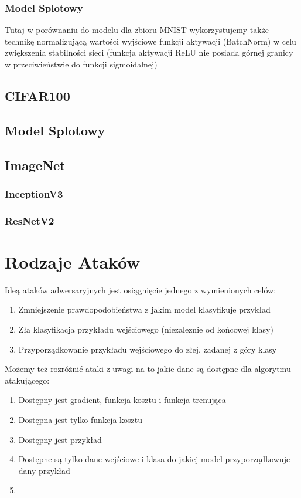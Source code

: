 \documentclass{article}
\begin{document}
        \subsubsection{Model Splotowy}
        Tutaj w porównaniu do modelu dla zbioru MNIST wykorzystujemy także technikę normalizującą wartości wyjściowe
        funkcji aktywacji (BatchNorm) w celu zwiększenia stabilności sieci (funkcja aktywacji ReLU nie posiada górnej granicy w
        przeciwieństwie do funkcji sigmoidalnej)

    \subsection{CIFAR100}
        \subsection{Model Splotowy}


    \subsection{ImageNet}
        \subsubsection{InceptionV3}
        \subsubsection{ResNetV2}




\section{Rodzaje Ataków}
Ideą ataków adwersaryjnych  jest osiągnięcie jednego z wymienionych celów:
\begin{enumerate}
    \item Zmniejszenie prawdopodobieństwa z jakim model klasyfikuje przykład
    \item Zła klasyfikacja przykładu wejściowego (niezaleznie od końcowej klasy)
    \item Przyporządkowanie przykładu wejściowego do złej, zadanej z góry klasy
\end{enumerate}

Możemy też rozróżnić ataki z uwagi na to jakie dane są dostępne dla algorytmu atakującego:
\begin{enumerate}
    \item Dostępny jest gradient, funkcja kosztu i funkcja trenująca
    \item Dostępna jest tylko funkcja kosztu
    \item Dostępny jest przykład
    \item Dostępne są tylko dane wejściowe i klasa do jakiej model przyporządkowuje dany przykład
    \item {}
\end{enumerate}
\end{document}
